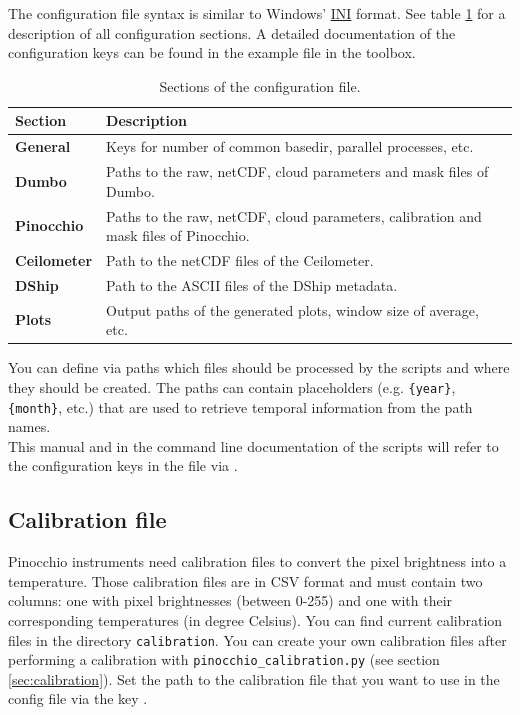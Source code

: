 \documentclass[11pt,a4paper]{article}
\begin{document}
The configuration file syntax is similar to Windows' \href{https://en.wikipedia.org/wiki/INI_file}{INI} format. See table \ref{tab:config-file} for a description of all configuration sections. A detailed documentation of the configuration keys can be found in the example file in the \cloud toolbox.\\

\begin{table}[h!]
	\centering
	\caption{Sections of the configuration file.}
	\label{tab:config-file}
    \begin{tabular}{|l|l|}
    \hline 
    \textbf{Section} & \textbf{Description} \\ 
    \hline \hline 
    \textbf{General} & Keys for number of common basedir, parallel processes, etc. \\ 
    \hline 
    \textbf{Dumbo} & Paths to the raw, netCDF, cloud parameters and mask files of Dumbo. \\ 
    \hline 
    \textbf{Pinocchio} & Paths to the raw, netCDF, cloud parameters, calibration and mask files of Pinocchio. \\ 
    \hline 
    \textbf{Ceilometer} & Path to the netCDF files of the Ceilometer. \\ 
    \hline 
    \textbf{DShip} & Path to the ASCII files of the DShip metadata. \\ 
    \hline 
    \textbf{Plots} & Output paths of the generated plots, window size of average, etc. \\ 
    \hline 
    \end{tabular}
\end{table}

You can define via paths which files should be processed by the scripts and where they should be created. The paths can contain placeholders (e.g. \texttt{\{year\}}, \texttt{\{month\}}, etc.) that are used to retrieve temporal information from the path names.\\

This manual and in the command line documentation of the scripts will refer to the configuration keys in the file via .

\subsection{Calibration file}
Pinocchio instruments need calibration files to convert the pixel brightness into a temperature. Those calibration files are in CSV format and must contain two columns: one with pixel brightnesses (between 0-255) and one with their corresponding temperatures (in degree Celsius). You can find current calibration files in the directory \texttt{calibration}. You can create your own calibration files after performing a calibration with \texttt{pinocchio\_calibration.py} (see section \ref{sec:calibration}). Set the path to the calibration file that you want to use in the config file via the key .
\end{document}
